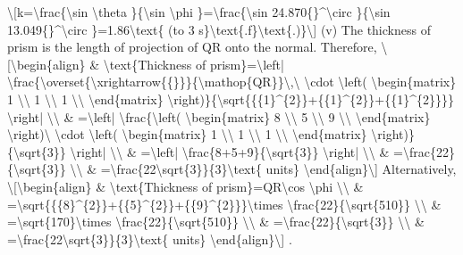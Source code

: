 \textbackslash{[}k=\textbackslash frac\{\textbackslash sin \textbackslash theta
\}\{\textbackslash sin \textbackslash phi \}=\textbackslash frac\{\textbackslash sin
24.870\{\}\textasciicircum\textbackslash circ \}\{\textbackslash sin
13.049\{\}\textasciicircum\textbackslash circ \}=1.86\textbackslash text\{
(to 3 s\}\textbackslash text\{.f\}\textbackslash text\{.)\}\textbackslash{]}
(v) The thickness of prism is the length of projection of QR onto
the normal. Therefore, \textbackslash{[}\textbackslash begin\{align\}
\& \textbackslash text\{Thickness of prism\}=\textbackslash left|
\textbackslash frac\{\textbackslash overset\{\textbackslash xrightarrow\{\{\}\}\}\{\textbackslash mathop\{QR\}\}\textbackslash ,\textbackslash{}
\textbackslash cdot \textbackslash left( \textbackslash begin\{matrix\}
1 \textbackslash\textbackslash{} 1 \textbackslash\textbackslash{}
1 \textbackslash\textbackslash{} \textbackslash end\{matrix\} \textbackslash right)\}\{\textbackslash sqrt\{\{\{1\}\textasciicircum\{2\}\}+\{\{1\}\textasciicircum\{2\}\}+\{\{1\}\textasciicircum\{2\}\}\}\}
\textbackslash right| \textbackslash\textbackslash{} \& =\textbackslash left|
\textbackslash frac\{\textbackslash left( \textbackslash begin\{matrix\}
8 \textbackslash\textbackslash{} 5 \textbackslash\textbackslash{}
9 \textbackslash\textbackslash{} \textbackslash end\{matrix\} \textbackslash right)\textbackslash{}
\textbackslash cdot \textbackslash left( \textbackslash begin\{matrix\}
1 \textbackslash\textbackslash{} 1 \textbackslash\textbackslash{}
1 \textbackslash\textbackslash{} \textbackslash end\{matrix\} \textbackslash right)\}\{\textbackslash sqrt\{3\}\}
\textbackslash right| \textbackslash\textbackslash{} \& =\textbackslash left|
\textbackslash frac\{8+5+9\}\{\textbackslash sqrt\{3\}\} \textbackslash right|
\textbackslash\textbackslash{} \& =\textbackslash frac\{22\}\{\textbackslash sqrt\{3\}\}
\textbackslash\textbackslash{} \& =\textbackslash frac\{22\textbackslash sqrt\{3\}\}\{3\}\textbackslash text\{
units\} \textbackslash end\{align\}\textbackslash{]} Alternatively,
\textbackslash{[}\textbackslash begin\{align\} \& \textbackslash text\{Thickness
of prism\}=QR\textbackslash cos \textbackslash phi \textbackslash\textbackslash{}
\& =\textbackslash sqrt\{\{\{8\}\textasciicircum\{2\}\}+\{\{5\}\textasciicircum\{2\}\}+\{\{9\}\textasciicircum\{2\}\}\}\textbackslash times
\textbackslash frac\{22\}\{\textbackslash sqrt\{510\}\} \textbackslash\textbackslash{}
\& =\textbackslash sqrt\{170\}\textbackslash times \textbackslash frac\{22\}\{\textbackslash sqrt\{510\}\}
\textbackslash\textbackslash{} \& =\textbackslash frac\{22\}\{\textbackslash sqrt\{3\}\}
\textbackslash\textbackslash{} \& =\textbackslash frac\{22\textbackslash sqrt\{3\}\}\{3\}\textbackslash text\{
units\} \textbackslash end\{align\}\textbackslash{]} .